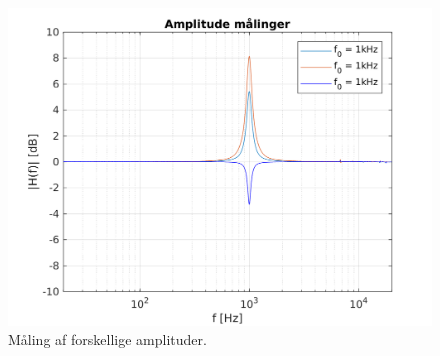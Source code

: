 
\begin{figure}[h!]
\centering
\includegraphics[scale = 0.8]{matlabdemo/test/test_amp.png}
\caption{Måling af forskellige amplituder.}
\label{fig:eq_amp}
\end{figure}


%







